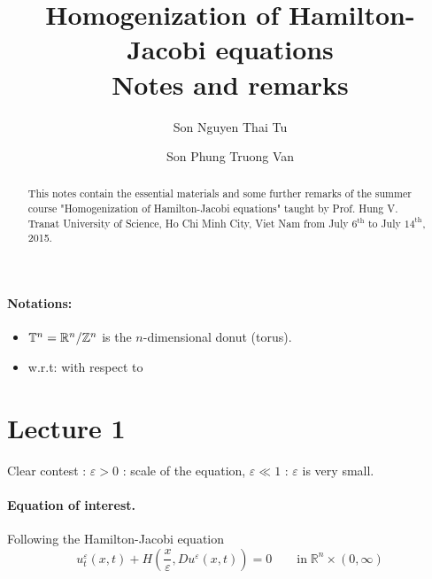 \documentclass[12pt, oneside]{amsart}  	%
\title{Homogenization of Hamilton-Jacobi equations\\ 
Notes and remarks}
\author{Son Nguyen Thai Tu}
\author{Son Phung Truong Van}
\date{}							%
\newcommand\Z{\mathbb{Z}} \newcommand\N{\mathbb{N}} \newcommand\C{\mathbb{C}}
\begin{document}
\maketitle

\begin{abstract}
This notes contain the essential materials and some further remarks of the summer course "Homogenization of Hamilton-Jacobi equations" taught by Prof. Hung V. Tran\footnotemark at University of Science, Ho Chi Minh City, Viet Nam from July $6^{\text{th}}$ to July $14^{\text{th}}$, 2015.
\end{abstract}






\newpage



\paragraph{\textbf{Notations:}}
\begin{itemize}
	\item $\mathbb{T}^n=\R^n/\Z^n$ is the $n$-dimensional donut (torus).
	\item w.r.t: with respect to
\end{itemize}

\vspace*{0.5cm}

\vspace*{0.5cm}
\section*{{\LARGE Lecture 1}}
\vspace*{0.5cm}

Clear contest : $\varepsilon>0$ : scale of the equation, $\varepsilon \ll 1$ : $\varepsilon$ is very small.\\

\paragraph{\textbf{Equation of interest.}} Following the Hamilton-Jacobi equation
\begin{equation}
u_t^{\varepsilon} (x,t) + H\left(\frac{x}{\varepsilon},Du^\varepsilon(x,t)\right) = 0\qquad\text{in}\;\mathbb{R}^n\times (0,\infty) \tag{I} \label{eq}
\end{equation}
\end{document}
